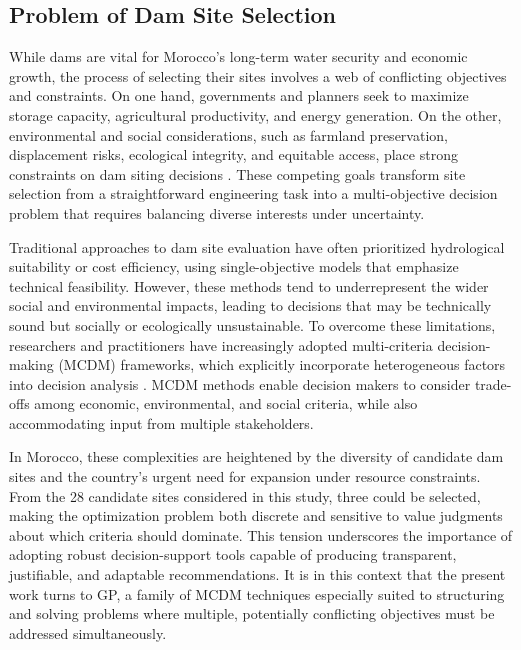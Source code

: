 \subsection{Problem of Dam Site Selection}
While dams are vital for Morocco's long-term water security and economic growth, the process of selecting their sites involves a web of conflicting objectives and constraints. On one hand, governments and planners seek to maximize storage capacity, agricultural productivity, and energy generation. On the other, environmental and social considerations, such as farmland preservation, displacement risks, ecological integrity, and equitable access, place strong constraints on dam siting decisions \cite{Wang2021,Zerdeb2025}. These competing goals transform site selection from a straightforward engineering task into a multi-objective decision problem that requires balancing diverse interests under uncertainty.

Traditional approaches to dam site evaluation have often prioritized hydrological suitability or cost efficiency, using single-objective models that emphasize technical feasibility. However, these methods tend to underrepresent the wider social and environmental impacts, leading to decisions that may be technically sound but socially or ecologically unsustainable. To overcome these limitations, researchers and practitioners have increasingly adopted multi-criteria decision-making (MCDM) frameworks, which explicitly incorporate heterogeneous factors into decision analysis \cite{Wang2021,Hagos2022}. MCDM methods enable decision makers to consider trade-offs among economic, environmental, and social criteria, while also accommodating input from multiple stakeholders.

In Morocco, these complexities are heightened by the diversity of candidate dam sites and the country's urgent need for expansion under resource constraints. From the 28 candidate sites considered in this study, three could be selected, making the optimization problem both discrete and sensitive to value judgments about which criteria should dominate. This tension underscores the importance of adopting robust decision-support tools capable of producing transparent, justifiable, and adaptable recommendations. It is in this context that the present work turns to \gls{GP}, a family of MCDM techniques especially suited to structuring and solving problems where multiple, potentially conflicting objectives must be addressed simultaneously.

